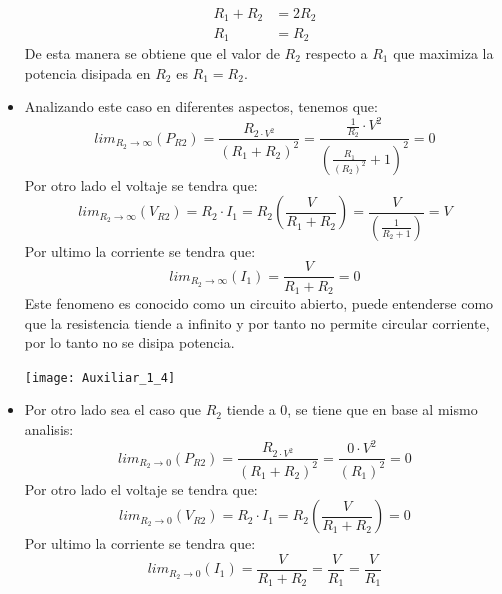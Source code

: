 \documentclass[
  11pt,
  letterpaper,
   addpoints,
   answers
  ]{exam}
\begin{document}
\begin{questions}
\begin{solution}
\begin{itemize}
\begin{align}
                R_{1} + R_{2} &= 2R_{2}\\
                R_{1} &= R_{2}
            \end{align}
            De esta manera se obtiene que el valor de $R_{2}$ respecto a $R_{1}$ que maximiza la potencia disipada en $R_{2}$ es $R_{1} = R_{2}$.
            \item Analizando este caso en diferentes aspectos, tenemos que:
            \begin{equation}
                lim_{R_{2} \to \infty} (P_{R2}) = \frac{R_{2 \cdot V^{2}}}{(R_{1} + R_{2})^{2}} = \frac{\frac{1}{R_{2}} \cdot V^{2}}{(\frac{R_{1}}{(R_{2})^{2}} + 1)^{2}} = 0
            \end{equation}
            Por otro lado el voltaje se tendra que:
            \begin{equation}
                lim_{R_{2} \to \infty} (V_{R2}) = R_{2} \cdot I_{1} = R_{2}\left( \frac{V}{R_{1} + R_{2}} \right) = \frac{V}{\left( \frac{1}{R_{2}+1}\right)} = V
            \end{equation}
        Por ultimo la corriente se tendra que:
        \begin{equation}
            lim_{R_{2} \to \infty} (I_{1}) = \frac{V}{R_{1} + R_{2}} = 0
        \end{equation}
        Este fenomeno es conocido como un circuito abierto, puede entenderse como que la resistencia tiende a infinito y por tanto no permite circular corriente, por lo tanto no se disipa potencia.
        \begin{center}
            \texttt{[image: Auxiliar\_1\_4]}
        \end{center}
        \item Por otro lado sea el caso que $R_{2}$ tiende a 0, se tiene que en base al mismo analisis:
        \begin{equation}
            lim_{R_{2} \to 0} (P_{R2}) = \frac{R_{2 \cdot V^{2}}}{(R_{1} + R_{2})^{2}} = \frac{0 \cdot V^{2}}{(R_{1})^{2}} = 0
        \end{equation}
        Por otro lado el voltaje se tendra que:
        \begin{equation}
            lim_{R_{2} \to 0} (V_{R2}) = R_{2} \cdot I_{1} = R_{2}\left( \frac{V}{R_{1} + R_{2}} \right) = 0
        \end{equation}
        Por ultimo la corriente se tendra que:
        \begin{equation}
            lim_{R_{2} \to 0} (I_{1}) = \frac{V}{R_{1} + R_{2}} = \frac{V}{R_{1}} = \frac{V}{R_{1}}

\end{equation}
\end{itemize}
\end{solution}
\end{questions}
\end{document}
